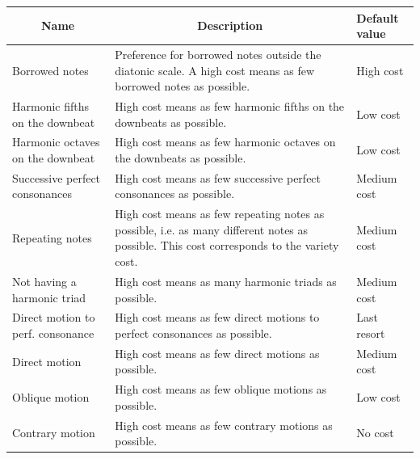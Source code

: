 \begin{table}[h!]
    \footnotesize
    \begin{adjustbox}{center}
        \begin{tabular}{|m{}|m{}|m{}<{\centering}|}
        \hline
        \multicolumn{1}{|c|}{\textbf{Name}} &
          \multicolumn{1}{c|}{\textbf{Description}} &
          \textbf{Default value} \\ \hline
        \cellcolor[HTML]{C8D6FF}Borrowed notes &
          Preference for borrowed notes outside the diatonic scale. A high cost means as few borrowed notes as possible. &
          High cost \\ \hline
        \cellcolor[HTML]{C8D6FF}Harmonic fifths on the downbeat &
          High cost means as few harmonic fifths on the downbeats as possible. &
          Low cost \\ \hline
        \cellcolor[HTML]{C8D6FF}Harmonic octaves on the downbeat &
          High cost means as few harmonic octaves on the downbeats as possible. &
          Low cost \\ \hline
        \cellcolor[HTML]{C8D6FF}Successive perfect consonances &
          High cost means as few successive perfect consonances as possible.&
          Medium cost \\ \hline
        \cellcolor[HTML]{C8D6FF}Repeating notes &
          High cost means as few repeating notes as possible, i.e. as many different notes as possible. This cost corresponds to the variety cost.&
          Medium cost \\ \hline
        \cellcolor[HTML]{C8D6FF}Not having a harmonic triad &
          High cost means as many harmonic triads as possible.&
          Medium cost \\ \hline
        \cellcolor[HTML]{C8D6FF}Direct motion to perf. consonance &
          High cost means as few direct motions to perfect consonances as possible.&
          Last resort \\ \hline
        \cellcolor[HTML]{C8D6FF}Direct motion &
          High cost means as few direct motions as possible. &
          Medium cost \\ \hline
        \cellcolor[HTML]{C8D6FF}Oblique motion &
          High cost means as few oblique motions as possible. &
          Low cost \\ \hline
        \cellcolor[HTML]{C8D6FF}Contrary motion &
          High cost means as few contrary motions as possible. &
          No cost \\ \hline

\end{tabular}
\end{adjustbox}
\end{table}
